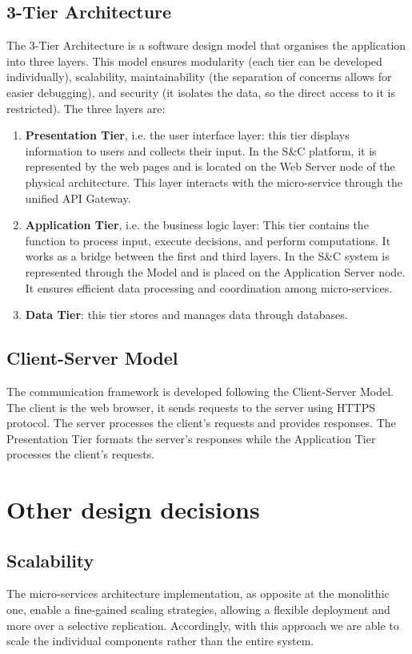 \subsection{3-Tier Architecture}
The 3-Tier Architecture is a software design model that organises the application into three layers. This model ensures modularity (each tier can be developed individually), scalability, maintainability (the separation of concerns allows for easier debugging), and security (it isolates the data, so the direct access to it is restricted). The three layers are:
\begin{enumerate}
    \item \textbf{Presentation Tier}, i.e. the user interface layer: this tier displays information to users and collects their input. In the S\&C platform, it is represented by the web pages and is located on the Web Server node of the physical architecture. This layer interacts with the micro-service through the unified API Gateway.
    \item \textbf{Application Tier}, i.e. the business logic layer: This tier contains the function to process input, execute decisions, and perform computations. It works as a bridge between the first and third layers. In the S\&C system is represented through the Model and is placed on the Application Server node. It ensures efficient data processing and coordination among micro-services.
    \item \textbf{Data Tier}: this tier stores and manages data through databases.
\end{enumerate}
\subsection{Client-Server Model}
The communication framework is developed following the Client-Server Model. The client is the web browser, it sends requests to the server using HTTPS protocol. The server processes the client's requests and provides responses. The Presentation Tier formats the server's responses while the Application Tier processes the client's requests.

\section{Other design decisions}
\subsection{Scalability}
The micro-services architecture implementation, as opposite at the monolithic one, enable a fine-gained scaling strategies, allowing a flexible deployment and more over a selective replication. Accordingly, with this approach we are able to scale the individual components rather than the entire system.

